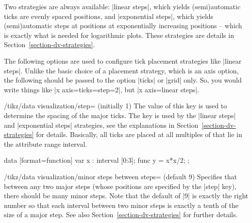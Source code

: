 Two strategies are always available: |linear steps|, which yields (semi)automatic ticks are evenly spaced positions, and |exponential steps|, which yields (semi)automatic steps at positions at exponentially increasing positions -- which is exactly what is needed for logarithmic plots. These strategies are details in Section~\ref{section-dv-strategies}.

The following options are used to configure tick placement strategies like |linear steps|. Unlike the basic choice of a placement strategy, which is an axis option, the following should be passed to the option |ticks| or |grid| only. So, you would write things like |x axis={ticks={step=2}}|, but |x axis={linear steps}|.

\begin{key}{/tikz/data visualization/step= (initially 1)}
    The value of this key is used to determine the spacing of the major ticks. The key is used by the |linear steps| and |exponential steps| strategies, see the explanations in Section~\ref{section-dv-strategies} for details. Basically, all ticks are placed at all multiples of  that lie in the attribute range interval.
\begin{codeexample}[preamble={\usetikzlibrary{datavisualization.formats.functions}}]
\tikz \datavisualization [
    school book axes, visualize as smooth line,
    y axis={ticks={step=1.25}},
  ]
    data [format=function] {
      var x : interval [0:3];
      func y = \value x*\value x/2;
    };
\end{codeexample}
\end{key}

\begin{key}{/tikz/data visualization/minor steps between steps= (default 9)}
    Specifies that between any two major steps (whose positions are specified by the |step| key), there should be  many minor steps. Note that the default of |9| is exactly the right number so that each interval between two minor steps is exactly a tenth of the size of a major step. See also Section~\ref{section-dv-strategies} for further details.
\begin{codeexample}[preamble={\usetikzlibrary{datavisualization.formats.functions}}]
\end{codeexample}
\end{key}

